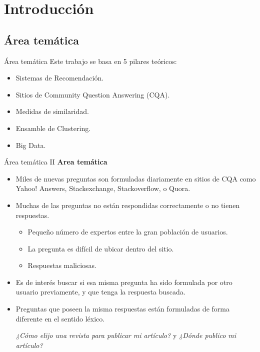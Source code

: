 \section{Introducción}

\subsection{Área temática}
\begin{frame}{Área temática}
	Este trabajo se basa en 5 pilares teóricos:
	\medskip
	\begin{itemize}[<*>]
		\item Sistemas de Recomendación.
		\item Sitios de Community Question Answering (CQA).
		\item Medidas de similaridad.
		\item Ensamble de Clustering.
		\item Big Data.
	\end{itemize}
\end{frame}

\begin{frame}{Área temática II}
	\textbf{Area temática}
	\medskip
	\begin{itemize}
		\item Miles de nuevas preguntas son formuladas diariamente en sitios de CQA como Yahoo! Answers, Stackexchange, Stackoverflow, o Quora.
		\item Muchas de las preguntas no están respondidas correctamente o no tienen respuestas.
		\begin{itemize}[<*>]
			\item Pequeño número de expertos entre la gran población de usuarios.
			\item La pregunta es difícil de ubicar dentro del sitio.
			\item Respuestas maliciosas.
		\end{itemize}
		\item Es de interés buscar si esa misma pregunta ha sido formulada por otro usuario previamente, y que tenga la respuesta buscada.
		\item Preguntas que poseen la misma respuestas están formuladas de forma diferente en el sentido léxico. \\
		\begin{center}
			\begin{footnotesize}
				\textit{¿Cómo elijo una revista para publicar mi artículo?} y \textit{¿Dónde publico mi artículo?}
			\end{footnotesize}
		\end{center}
	\end{itemize}
 \end{frame}

